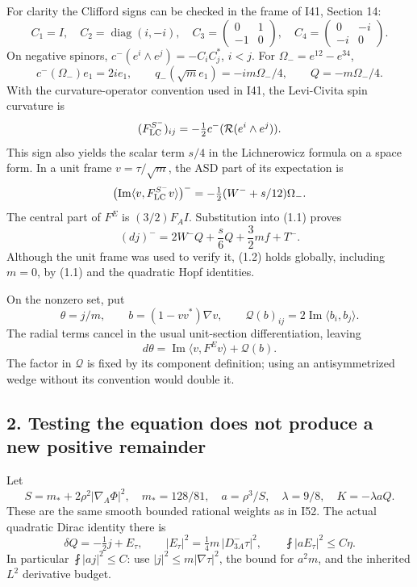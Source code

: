 \documentclass[
  10pt,
]{article}
\begin{document}
For clarity the Clifford signs can be checked in the frame of I41,
Section 14: \[
 C_1=I,\quad C_2=\operatorname{diag}(i,-i),\quad
 C_3=\begin{pmatrix}0&1\\-1&0\end{pmatrix},\quad
 C_4=\begin{pmatrix}0&-i\\-i&0\end{pmatrix}.
\] On negative spinors, \(c^-(e^i\wedge e^j)=-C_iC_j^*\), \(i<j\). For
\(\Omega_-=e^{12}-e^{34}\), \[
 c^-(\Omega_-)e_1=2ie_1,\qquad
 q_-(\sqrt m e_1)=-im\Omega_-/4,\qquad Q=-m\Omega_-/4.
\] With the curvature-operator convention used in I41, the Levi-Civita
spin curvature is \[
 (F_{\rm LC}^{S^-})_{ij}
        =-\tfrac12c^-(\mathcal R(e^i\wedge e^j)).
\] This sign also yields the scalar term \(s/4\) in the Lichnerowicz
formula on a space form. In a unit frame \(v=\tau/\sqrt m\), the ASD
part of its expectation is \[
 \bigl(\operatorname{Im}\langle v,F_{\rm LC}^{S^-}v\rangle\bigr)^-
       =-\tfrac12(W^-+s/12)\Omega_-.
\] The central part of \(F^E\) is \((3/2)F_A I\). Substitution into
(1.1) proves \[
 \boxed{(dj)^-=2W^-Q+\frac{s}{6}Q+\frac32 m f+T^-.}    \tag{1.2}
\] Although the unit frame was used to verify it, (1.2) holds globally,
including \(m=0\), by (1.1) and the quadratic Hopf identities.

On the nonzero set, put \[
 \theta=j/m,\qquad b=(1-vv^*)\nabla v,\qquad
 \mathcal Q(b)_{ij}=2\operatorname{Im}\langle b_i,b_j\rangle .
\] The radial terms cancel in the usual unit-section differentiation,
leaving \[
 d\theta=\operatorname{Im}\langle v,F^Ev\rangle+\mathcal Q(b).
                                                               \tag{1.3}
\] The factor in \(\mathcal Q\) is fixed by its component definition;
using an antisymmetrized wedge without its convention would double it.

\hypertarget{testing-the-equation-does-not-produce-a-new-positive-remainder}{%
\subsection{2. Testing the equation does not produce a new positive
remainder}\label{testing-the-equation-does-not-produce-a-new-positive-remainder}}

Let \[
 S=m_*+2\rho^2|\nabla_A\Phi|^2,\quad
 m_*=128/81,\quad a=\rho^3/S,\quad \lambda=9/8,\quad K=-\lambda aQ.
\] These are the same smooth bounded rational weights as in I52. The
actual quadratic Dirac identity there is \[
 \delta Q=-\tfrac12 j+E_\tau,\qquad
 |E_\tau|^2=\tfrac14m\,|D^-_{3A}\tau|^2,\qquad
 \fint|aE_\tau|^2\le C\eta.
\] In particular \(\fint|aj|^2\le C\): use \(|j|^2\le m|\nabla\tau|^2\),
the bound for \(a^2m\), and the inherited \(L^2\) derivative budget.
\end{document}
